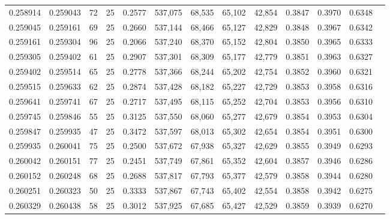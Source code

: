 \begin{tabular}{rrrrrrrrrrrrr}
0.258914 & 0.259043 &    72 &  25 &                                     0.2577 & 537,075 &  68,535 &  65,102 &  42,854 & 0.3847 & 0.3970 & 0.6348 \\
0.259045 & 0.259161 &    69 &  25 &                                     0.2660 & 537,144 &  68,466 &  65,127 &  42,829 & 0.3848 & 0.3967 & 0.6342 \\
0.259161 & 0.259304 &    96 &  25 &                                     0.2066 & 537,240 &  68,370 &  65,152 &  42,804 & 0.3850 & 0.3965 & 0.6333 \\
0.259305 & 0.259402 &    61 &  25 &                                     0.2907 & 537,301 &  68,309 &  65,177 &  42,779 & 0.3851 & 0.3963 & 0.6327 \\
0.259402 & 0.259514 &    65 &  25 &                                     0.2778 & 537,366 &  68,244 &  65,202 &  42,754 & 0.3852 & 0.3960 & 0.6321 \\
0.259515 & 0.259633 &    62 &  25 &                                     0.2874 & 537,428 &  68,182 &  65,227 &  42,729 & 0.3853 & 0.3958 & 0.6316 \\
0.259641 & 0.259741 &    67 &  25 &                                     0.2717 & 537,495 &  68,115 &  65,252 &  42,704 & 0.3853 & 0.3956 & 0.6310 \\
0.259745 & 0.259846 &    55 &  25 &                                     0.3125 & 537,550 &  68,060 &  65,277 &  42,679 & 0.3854 & 0.3953 & 0.6304 \\
0.259847 & 0.259935 &    47 &  25 &                                     0.3472 & 537,597 &  68,013 &  65,302 &  42,654 & 0.3854 & 0.3951 & 0.6300 \\
0.259935 & 0.260041 &    75 &  25 &                                     0.2500 & 537,672 &  67,938 &  65,327 &  42,629 & 0.3855 & 0.3949 & 0.6293 \\
0.260042 & 0.260151 &    77 &  25 &                                     0.2451 & 537,749 &  67,861 &  65,352 &  42,604 & 0.3857 & 0.3946 & 0.6286 \\
0.260152 & 0.260248 &    68 &  25 &                                     0.2688 & 537,817 &  67,793 &  65,377 &  42,579 & 0.3858 & 0.3944 & 0.6280 \\
0.260251 & 0.260323 &    50 &  25 &                                     0.3333 & 537,867 &  67,743 &  65,402 &  42,554 & 0.3858 & 0.3942 & 0.6275 \\
0.260329 & 0.260438 &    58 &  25 &                                     0.3012 & 537,925 &  67,685 &  65,427 &  42,529 & 0.3859 & 0.3939 & 0.6270 \\

\end{tabular}
